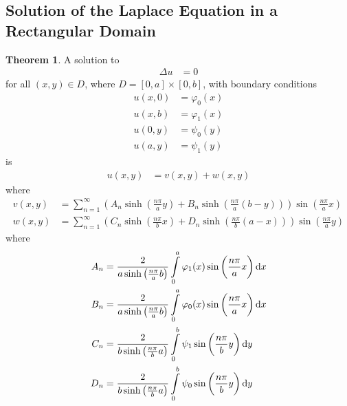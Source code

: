 \documentclass[titlepage, fleqn, a4paper, 12pt, twoside]{article}
\theoremstyle{definition}
\theoremstyle{theorem}
\newtheorem{theorem}{Theorem}
\begin{document}
\subsection{Solution of the Laplace Equation in a Rectangular Domain}

\begin{theorem}
	A solution to
	\begin{align*}
		\Delta u & = 0
	\end{align*}
	for all $(x,y) \in D$, where $D = [0,a] \times [0,b]$, with boundary conditions
	\begin{align*}
		u(x,0) & = \varphi_0(x) \\
		u(x,b) & = \varphi_1(x) \\
		u(0,y) & = \psi_0(y)    \\
		u(a,y) & = \psi_1(y)
	\end{align*}
	is
	\begin{align*}
		u(x,y) & = v(x,y) + w(x,y)
	\end{align*}
	where
	\begin{align*}
		v(x,y) & = \sum\limits_{n = 1}^{\infty} \left( A_n \sinh\left( \frac{n \pi}{a} y \right) + B_n \sinh\left( \frac{n \pi}{a} (b - y) \right) \right) \sin\left( \frac{n \pi}{a} x \right) \\
		w(x,y) & = \sum\limits_{n = 1}^{\infty} \left( C_n \sinh\left( \frac{n \pi}{b} x \right) + D_n \sinh\left( \frac{n \pi}{b} (a - x) \right) \right) \sin\left( \frac{n \pi}{a} y \right)
	\end{align*}
	where
	\begin{align*}
		A_n & = \frac{2}{a \sinh\left( \frac{n \pi}{a} b \right)} \int\limits_{0}^{a} \varphi_1(x) \sin\left( \frac{n \pi}{a} x \right) \dif x \\
		B_n & = \frac{2}{a \sinh\left( \frac{n \pi}{a} b \right)} \int\limits_{0}^{a} \varphi_0(x) \sin\left( \frac{n \pi}{a} x \right) \dif x \\
		C_n & = \frac{2}{b \sinh\left( \frac{n \pi}{b} a \right)} \int\limits_{0}^{b} \psi_1 \sin\left( \frac{n \pi}{b} y \right) \dif y       \\
		D_n & = \frac{2}{b \sinh\left( \frac{n \pi}{b} a \right)} \int\limits_{0}^{b} \psi_0 \sin\left( \frac{n \pi}{b} y \right) \dif y
	\end{align*}
\end{theorem}
\end{document}
